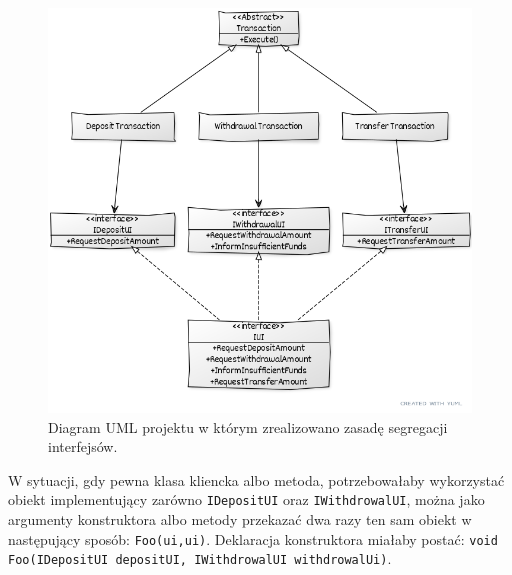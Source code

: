 \begin{figure}[hbt!]
	\centering
	\includegraphics[width=0.8\linewidth]{images/SolidIspUml}
	\caption{Diagram UML projektu w którym zrealizowano zasadę segregacji interfejsów.}
	\label{lab1/fig/SolidIspUml}
\end{figure}
%
%
%
%
%
%

W sytuacji, gdy pewna klasa kliencka albo metoda, potrzebowałaby wykorzystać obiekt implementujący zarówno \texttt{IDepositUI} oraz \texttt{IWithdrowalUI}, można jako argumenty konstruktora albo metody przekazać dwa razy ten sam obiekt w następujący sposób: \texttt{Foo(ui,ui)}. Deklaracja konstruktora miałaby postać: \texttt{void Foo(IDepositUI depositUI, IWithdrowalUI withdrowalUi)}.

